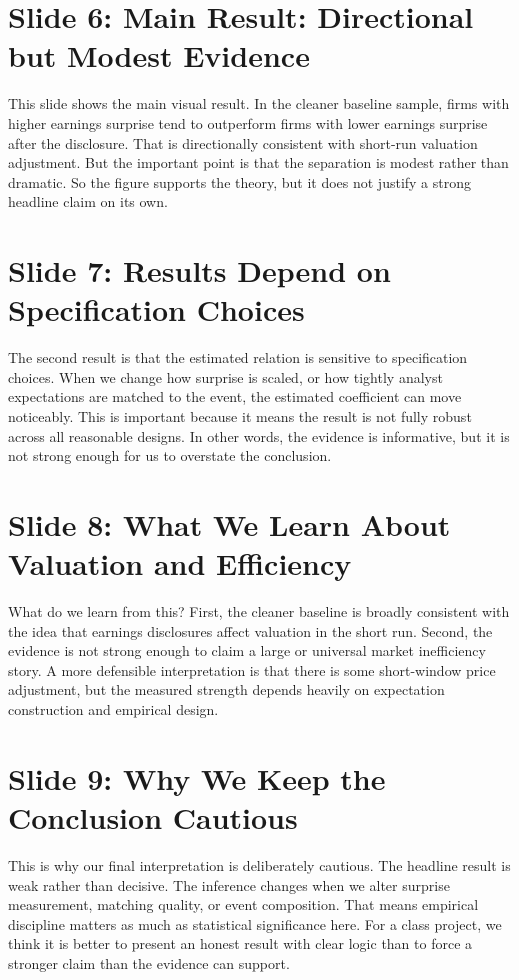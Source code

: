 \documentclass[11pt,a4paper]{article}
\begin{document}
\section*{Slide 6: Main Result: Directional but Modest Evidence}
This slide shows the main visual result. In the cleaner baseline sample, firms with higher earnings surprise tend to outperform firms with lower earnings surprise after the disclosure. That is directionally consistent with short-run valuation adjustment. But the important point is that the separation is modest rather than dramatic. So the figure supports the theory, but it does not justify a strong headline claim on its own.

\section*{Slide 7: Results Depend on Specification Choices}
The second result is that the estimated relation is sensitive to specification choices. When we change how surprise is scaled, or how tightly analyst expectations are matched to the event, the estimated coefficient can move noticeably. This is important because it means the result is not fully robust across all reasonable designs. In other words, the evidence is informative, but it is not strong enough for us to overstate the conclusion.

\section*{Slide 8: What We Learn About Valuation and Efficiency}
What do we learn from this? First, the cleaner baseline is broadly consistent with the idea that earnings disclosures affect valuation in the short run. Second, the evidence is not strong enough to claim a large or universal market inefficiency story. A more defensible interpretation is that there is some short-window price adjustment, but the measured strength depends heavily on expectation construction and empirical design.

\section*{Slide 9: Why We Keep the Conclusion Cautious}
This is why our final interpretation is deliberately cautious. The headline result is weak rather than decisive. The inference changes when we alter surprise measurement, matching quality, or event composition. That means empirical discipline matters as much as statistical significance here. For a class project, we think it is better to present an honest result with clear logic than to force a stronger claim than the evidence can support.
\end{document}
